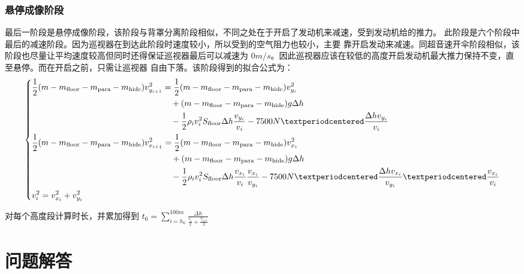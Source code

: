 \documentclass[hyperref,a4paper,UTF8]{ctexart}
\begin{document}
\subsubsection{悬停成像阶段}
最后一阶段是悬停成像阶段，该阶段与背罩分离阶段相似，不同之处在于开启了发动机来减速，受到发动机给的推力。
此阶段是六个阶段中最后的减速阶段。因为巡视器在到达此阶段时速度较小，所以受到的空气阻力也较小，主要
靠开启发动来减速。同超音速开伞阶段相似，该阶段也尽量让平均速度较高但同时还得保证巡视器最后可以减速为
$0m/s$。因此巡视器应该在较低的高度开启发动机最大推力保持不变，直至悬停。而在开启之前，只需让巡视器
自由下落。该阶段得到的拟合公式为：
\[
    \begin{dcases}
        \begin{split}
            \frac{1}{2}(m-m_{\text{floor}}-m_{\text{para}}-m_{\text{hide}})v_{y_{i + 1}}^2 &=
            \frac{1}{2}(m-m_{\text{floor}}-m_{\text{para}}-m_{\text{hide}})
            v_{y_{i}}^2 \\ &\quad + (m-m_{\text{floor}}-m_{\text{para}}-m_{\text{hide}})
            g\Delta h\\ &\quad -\frac{1}{2}\rho _iv_i^2S_{\text{floor}}\Delta h
            \frac{v_{y_i}}{v_i} - 7500N·\frac{\Delta hv_{y_i}}{v_i}
        \end{split}
        \\
        \begin{split}
            \frac{1}{2}(m-m_{\text{floor}}-m_{\text{para}}-m_{\text{hide}})v_{x_{i + 1}}^2 &=
            \frac{1}{2}(m-m_{\text{floor}}-m_{\text{para}}-m_{\text{hide}})
            v_{x_{i}}^2 \\ &\quad + (m-m_{\text{floor}}-m_{\text{para}}-m_{\text{hide}})
            g\Delta h \\ &\quad -\frac{1}{2}\rho _iv_i^2S_{\text{floor}}\Delta h
            \frac{v_{x_i}}{v_i}\frac{v_{x_i}}{v_{y_i}} -
            7500N·\frac{\Delta hv_{x_i}}{v_{y_i}}·\frac{v_{x_i}}{v_i}
        \end{split}
        \\
        v_i^2 = v_{x_i}^2 + v_{y_i}^2
    \end{dcases}
\]

对每个高度段计算时长，并累加得到
$
    \displaystyle t_6=\sum_{i=h_6}^{100m}{\displaystyle\frac{\Delta h}{\frac{\displaystyle v_i}
        {\displaystyle 2}+\frac{\displaystyle v_{\textrm{i+1}} }{\displaystyle 2}}}
$

\section{问题解答}
\end{document}
